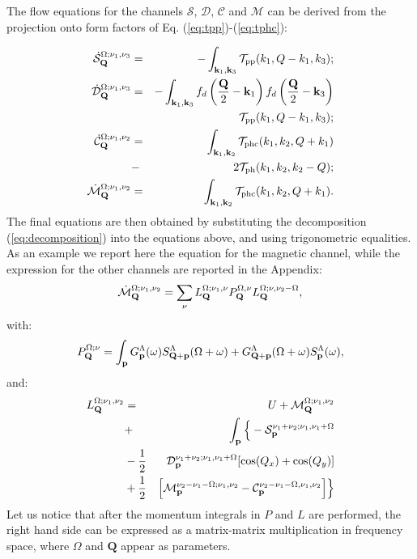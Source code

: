 The flow equations for the channels $\mathcal{S}$,  $\mathcal{D}$, $\mathcal{C}$ and $\mathcal{M}$ can be derived from the projection onto form factors of Eq. (\ref{eq:tpp})-(\ref{eq:tphc}):

\begin{eqnarray}
\dot{\mathcal{S}}_{\mathbf{Q}}^{\Omega;\nu_1,\nu_3}  &=& - \int _{\mathbf{k}_1, \mathbf{k}_3 } \mathcal{T}_{\mathrm{pp}}(k_1,Q-k_1,k_3); \\ 
\dot{\mathcal{D}}_{\mathbf{Q}}^{\Omega;\nu_1,\nu_3}  &=& -
\int _{\mathbf{k}_1,\mathbf{k}_3}  f_d\left( {\frac{\mathbf{Q}}{2} - \mathbf{k}_1} \right ) f_d\left ({\frac{\mathbf{Q}}{2} - \mathbf{k}_3} \right)  \nonumber \\ 
 &&\mathcal{T}_{\mathrm{pp}}(k_1,Q-k_1,k_3) ; 
\\
\nonumber
\dot{\mathcal{C}}_{\mathbf{Q}}^{\Omega;\nu_1,\nu_2} &=& 
\int _{\mathbf{k}_1,\mathbf{k}_2}   \mathcal{T}_{\mathrm{phc}}(k_1,k_2,Q+k_1)\\ &-&2\mathcal{T}_{\mathrm{ph}}(k_1,k_2,k_2-Q) ; 
\\ 
\dot{\mathcal{M}}_{\mathbf{Q}}^{\Omega;\nu_1,\nu_2} & =& 
\int _{\mathbf{k}_1,\mathbf{k}_2}  \mathcal{T}_{\mathrm{phc}}(k_1,k_2,Q+k_1). 
\end{eqnarray}
The final equations are then obtained by substituting the decomposition (\ref{eq:decomposition}) into the equations above, and using trigonometric equalities.
As an example we report here the equation for the magnetic channel, while the expression for the other channels are reported in the Appendix: 
\begin{equation}
\dot{\mathcal{M}}_{\mathbf{Q}}^{\Omega;\nu_1,\nu_2} = \sum_{\nu} L^{\Omega; \nu_1,\nu}_{\mathbf{Q}} P_{\mathbf{Q}}^{\Omega,\nu} L^{\Omega; \nu,\nu_2-\Omega}_{\mathbf{Q}}, 
\end{equation} 	   
with: 
\begin{equation}
P_{\mathbf{Q}}^{\Omega;\nu} = \int_{\mathbf{p}}  G^\Lambda_{\mathbf{p}}(\omega)S^\Lambda_{\mathbf{Q}+\mathbf{p}}
(\Omega+\omega) +G^\Lambda_{\mathbf{Q}+\mathbf{p}}(\Omega+\omega)
S^\Lambda_{\mathbf{p}} (\omega), 
\end{equation} 
and: 
\begin{eqnarray} 
\nonumber
L^{\Omega;\nu_1,\nu_2}_{\mathbf{Q}}&=&U+\mathcal{M}_{\mathbf{Q}}^{\Omega;\nu_1,\nu_2} \\
\nonumber 
&+& \int_{\mathbf{p}} \Big \{- \mathcal{S}_{\mathbf{p}}^{\nu_1+\nu_2;\nu_1,\nu_1+\Omega}  
 \\
 \nonumber 
&-\frac{1}{2}& \mathcal{D}_{\mathbf{p}}^{\nu_1+\nu_2;\nu_1,\nu_1+\Omega}
[\cos(Q_x)+\cos(Q_y)]
 \\ 
&+\frac{1}{2}& \Big[  \mathcal{M}_{\mathbf{p}}^{\nu_2-\nu_1-\Omega; \nu_1,\nu_2} 
- \mathcal{C}_{\mathbf{p}}^{\nu_2-\nu_1-\Omega,\nu_1,\nu_2} \Big] 
\Big \} 
\end{eqnarray}	 
Let us notice that after the momentum integrals in $P$ and $L$ are performed, the right hand side can be expressed as a matrix-matrix multiplication in frequency space, where $\Omega$ and $\mathbf{Q}$ appear as parameters.

